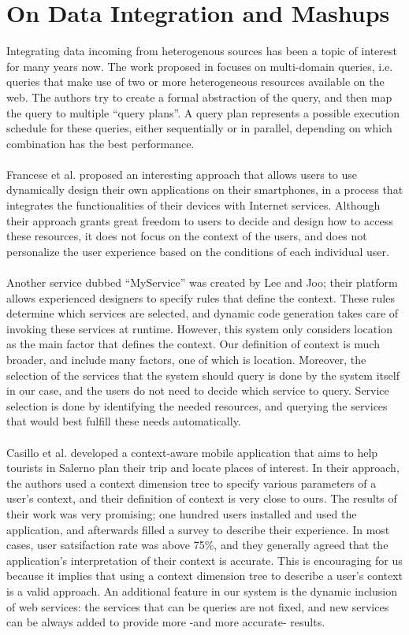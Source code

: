 \section{On Data Integration and Mashups}
Integrating data incoming from heterogenous sources has been a topic of interest for many years now. The work proposed in \cite{braga} focuses on multi-domain queries, i.e. queries that make use of two or more heterogeneous resources available on the web. The authors try to create a formal abstraction of the query, and then map the query to multiple ``query plans''. A query plan represents a possible execution schedule for these queries, either sequentially or in parallel, depending on which combination has the best performance.\\\\
Francese et al.\cite{dynamicapp} proposed an interesting approach that allows users to use dynamically design their own applications on their smartphones, in a process that integrates the functionalities of their devices with Internet services. Although their approach grants great freedom to users to decide and design how to access these resources, it does not focus on the context of the users, and does not personalize the user experience based on the conditions of each individual user.\\\\
Another service dubbed ``MyService'' was created by Lee and Joo\cite{myservice}; their platform allows experienced designers to specify rules that define the context. These rules determine which services are selected, and dynamic code generation takes care of invoking these services at runtime. However, this system only considers location as the main factor that defines the context. Our definition of context is much broader, and include many factors, one of which is location. Moreover, the selection of the services that the system should query is done by the system itself in our case, and the users do not need to decide which service to query. Service selection is done by identifying the needed resources, and querying the services that would best fulfill these needs automatically.\\\\
Casillo et al.\cite{casillo} developed a context-aware mobile application that aims to help tourists in Salerno plan their trip and locate places of interest. In their approach, the authors used a context dimension tree to specify various parameters of a user's context, and their definition of context is very close to ours. The results of their work was very promising; one hundred users installed and used the application, and afterwards filled a survey to describe their experience. In most cases, user satsifaction rate was above 75\%, and they generally agreed that the application's interpretation of their context is accurate. This is encouraging for us because it implies that using a context dimension tree to describe a user's context is a valid approach. An additional feature in our system is the dynamic inclusion of web services: the services that can be queries are not fixed, and new services can be always added to provide more -and more accurate- results.\\\\
